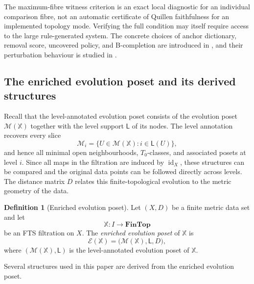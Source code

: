 \documentclass[a4paper,11pt]{article}
\theoremstyle{definition}
\newtheorem{definition}[definition]{Definition}
\theoremstyle{remark}
\DeclareMathOperator{\id}{id}
\begin{document}
The maximum-fibre witness criterion is an exact local diagnostic for an individual comparison fibre, not an automatic certificate of Quillen faithfulness for an implemented topology mode. Verifying the full condition may itself require access to the large rule-generated system. The concrete choices of anchor dictionary, removal score, uncovered policy, and B-completion are introduced in , and their perturbation behaviour is studied in .



\subsection{The enriched evolution poset and its derived structures}
\label{subsec:evolution-poset-derived-structures}

Recall that the level-annotated evolution poset consists of the evolution poset $\mathcal M(\mathbb X)$ together with the level support $\mathsf L$ of its nodes. The level annotation recovers every slice
$$
\mathcal M_i = \{U\in\mathcal M(\mathbb X)\colon i\in\mathsf L(U)\},
$$
and hence all minimal open neighbourhoods, $T_0$-classes, and associated posets at level $i$. Since all maps in the filtration are induced by $\id_X$, these structures can be compared and the original data points can be followed directly across levels. The distance matrix $D$ relates this finite-topological evolution to the metric geometry of the data.

\begin{definition}[Enriched evolution poset]
\label{def:enriched-evolution-poset}
Let $(X,D)$ be a finite metric data set and let
$$
\mathbb X\colon I\longrightarrow\mathbf{FinTop}
$$
be an FTS filtration on $X$. The \emph{enriched evolution poset} of $\mathbb X$ is
$$
\mathcal E(\mathbb X) = \bigl(\mathcal M(\mathbb X),\mathsf L,D\bigr),
$$
where $(\mathcal M(\mathbb X),\mathsf L)$ is the level-annotated evolution poset of $\mathbb X$.
\end{definition}

Several structures used in this paper are derived from the enriched evolution poset.
\end{document}
